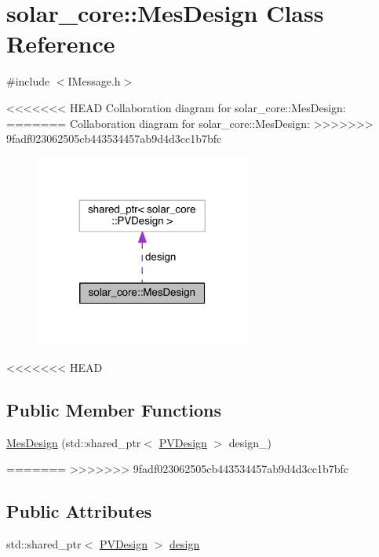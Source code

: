 \hypertarget{classsolar__core_1_1_mes_design}{}\section{solar\+\_\+core\+:\+:Mes\+Design Class Reference}
\label{classsolar__core_1_1_mes_design}


{\ttfamily \#include $<$I\+Message.\+h$>$}



<<<<<<< HEAD
Collaboration diagram for solar\+\_\+core\+:\+:Mes\+Design\+:\nopagebreak
=======
Collaboration diagram for solar\+\_\+core\+:\+:Mes\+Design\+:
\nopagebreak
>>>>>>> 9fadf023062505cb443534457ab9d4d3cc1b7bfc
\begin{figure}[H]
\begin{center}
\leavevmode
\includegraphics[width=200pt]{classsolar__core_1_1_mes_design__coll__graph}
\end{center}
\end{figure}
<<<<<<< HEAD
\subsection*{Public Member Functions}
\begin{DoxyCompactItemize}
\item 
\hyperlink{classsolar__core_1_1_mes_design_a29c0de1da8ebd663d94c02bc65ef8539}{Mes\+Design} (std\+::shared\+\_\+ptr$<$ \hyperlink{classsolar__core_1_1_p_v_design}{P\+V\+Design} $>$ design\+\_\+)
\end{DoxyCompactItemize}
=======
>>>>>>> 9fadf023062505cb443534457ab9d4d3cc1b7bfc
\subsection*{Public Attributes}
\begin{DoxyCompactItemize}
\item 
std\+::shared\+\_\+ptr$<$ \hyperlink{classsolar__core_1_1_p_v_design}{P\+V\+Design} $>$ \hyperlink{classsolar__core_1_1_mes_design_a85bd3d4d32c763ac3f9c6547ab4002ab}{design}
\end{DoxyCompactItemize}


